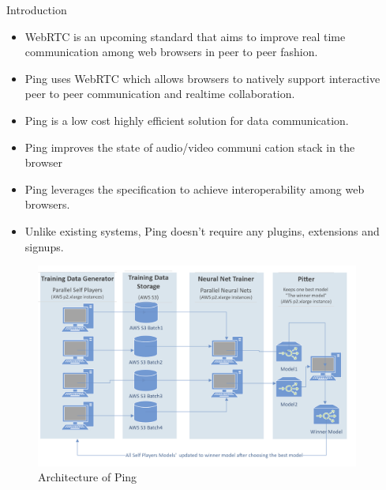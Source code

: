 \documentclass[final]{beamer}
\newlength{\sepwid}
\newlength{\onecolwid}
\begin{document}
\begin{frame}[t]
\begin{columns}[t]
\begin{column}{\onecolwid}
\begin{block}{Introduction}
\begin{itemize}
\item WebRTC is an upcoming standard that aims to improve real time communication among web browsers in peer to peer fashion.
\item Ping uses WebRTC which allows browsers to natively support interactive peer to peer communication and realtime collaboration.
\item Ping is a low cost highly efficient solution for data communication.
\item Ping improves the state of audio/video communi									cation stack in the browser
\item Ping leverages the specification to achieve interoperability among web browsers.
\item Unlike existing systems, Ping doesn't require any plugins, extensions and signups. 
\end{itemize}



\end{block}


\begin{figure}
\includegraphics[width=1.0\linewidth]{distributed_arch.png}
\caption{Architecture of Ping}
\end{figure}


\end{column} %

\begin{column}{\sepwid}\end{column} %


\end{columns}
\end{frame}
\end{document}

